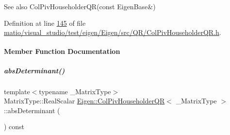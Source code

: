 \begin{DoxySeeAlso}{See also}
Col\+Piv\+Householder\+Q\+R(const Eigen\+Base\&) 
\end{DoxySeeAlso}


Definition at line \hyperlink{matio_2visual__studio_2test_2eigen_2_eigen_2src_2_q_r_2_col_piv_householder_q_r_8h_source_l00145}{145} of file \hyperlink{matio_2visual__studio_2test_2eigen_2_eigen_2src_2_q_r_2_col_piv_householder_q_r_8h_source}{matio/visual\+\_\+studio/test/eigen/\+Eigen/src/\+Q\+R/\+Col\+Piv\+Householder\+Q\+R.\+h}.



\paragraph{Member Function Documentation}
\mbox{\label{group___q_r___module_aa02e3a293e50b3cf13adb94575db26f5}} 
\subparagraph{\texorpdfstring{abs\+Determinant()}{absDeterminant()}\hspace{0.1cm}{\footnotesize\ttfamily [1/2]}}
{\footnotesize\ttfamily template$<$typename \+\_\+\+Matrix\+Type$>$ \\
Matrix\+Type\+::\+Real\+Scalar \hyperlink{group___q_r___module_class_eigen_1_1_col_piv_householder_q_r}{Eigen\+::\+Col\+Piv\+Householder\+QR}$<$ \+\_\+\+Matrix\+Type $>$\+::abs\+Determinant (\begin{DoxyParamCaption}{ }\end{DoxyParamCaption}) const}

